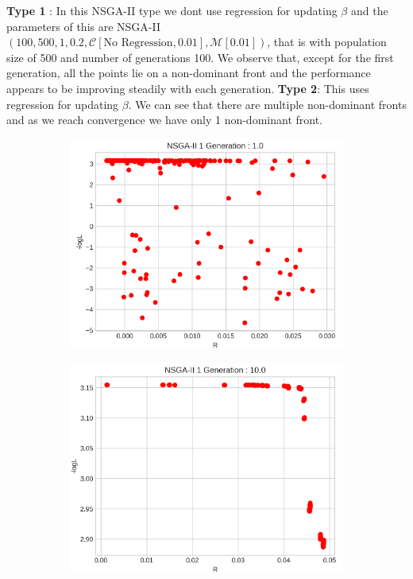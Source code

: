 \textbf{Type 1} : In this NSGA-II type we dont use regression for updating $\beta$ and the parameters of this are 
NSGA-II$(100,500,1,0.2,\mathcal{C}[\text{No Regression},0.01],\mathcal{M}[0.01])$, that is with population size of 500 and number of generations 100. We observe that, except for the first generation, all the points lie on a non-dominant front and the performance appears to be improving steadily with each generation. \newline \textbf{Type 2}: This uses regression for updating $\beta$. We can see that there are multiple non-dominant fronts and as we reach convergence we have only 1 non-dominant front.
\begin{figure}[H]
  \centering
  \begin{minipage}[b]{0.22\textwidth}
  \begin{figure}[H]
      \centering
      \includegraphics[width=\textwidth]{images/1-NSGA-II 1 Generation _ 1.0-R - logL-point.png}
  \end{figure}
  \end{minipage}
  \hspace{0.0cm}
  \begin{minipage}[b]{0.22\textwidth}
  \begin{figure}[H]
      \centering
      \includegraphics[width=\textwidth]{images/1-NSGA-II 1 Generation _ 10.0-R - logL-point.png}

\end{figure}
\end{minipage}
\end{figure}
